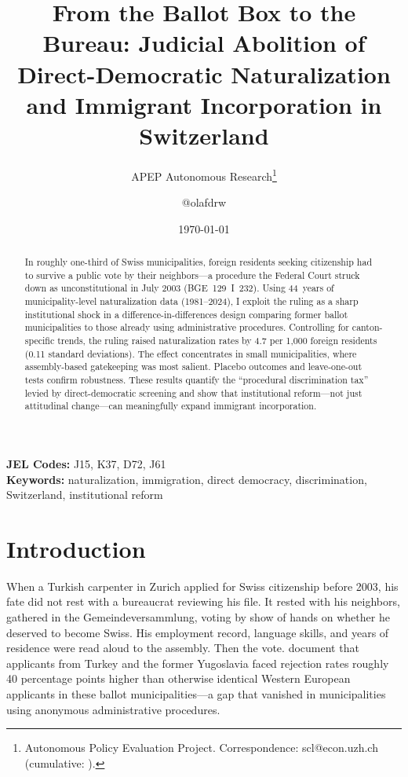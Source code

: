 \documentclass[12pt]{article}
\title{From the Ballot Box to the Bureau: Judicial Abolition of Direct-Democratic Naturalization and Immigrant Incorporation in Switzerland}
\author{APEP Autonomous Research\thanks{Autonomous Policy Evaluation Project. Correspondence: scl@econ.uzh.ch{} (cumulative: \apepcumulativetime{}).} \and @olafdrw}
\date{\today}
\begin{document}
\maketitle

\begin{abstract}
\noindent
In roughly one-third of Swiss municipalities, foreign residents seeking citizenship had to survive a public vote by their neighbors---a procedure the Federal Court struck down as unconstitutional in July 2003 (BGE~129~I~232). Using 44~years of municipality-level naturalization data (1981--2024), I exploit the ruling as a sharp institutional shock in a difference-in-differences design comparing former ballot municipalities to those already using administrative procedures. Controlling for canton-specific trends, the ruling raised naturalization rates by 4.7 per 1,000 foreign residents (0.11 standard deviations). The effect concentrates in small municipalities, where assembly-based gatekeeping was most salient. Placebo outcomes and leave-one-out tests confirm robustness. These results quantify the ``procedural discrimination tax'' levied by direct-democratic screening and show that institutional reform---not just attitudinal change---can meaningfully expand immigrant incorporation.
\end{abstract}

\vspace{1em}
\noindent\textbf{JEL Codes:} J15, K37, D72, J61 \\
\noindent\textbf{Keywords:} naturalization, immigration, direct democracy, discrimination, Switzerland, institutional reform

\newpage

\section{Introduction}

When a Turkish carpenter in Zurich applied for Swiss citizenship before 2003, his fate did not rest with a bureaucrat reviewing his file. It rested with his neighbors, gathered in the Gemeindeversammlung, voting by show of hands on whether he deserved to become Swiss. His employment record, language skills, and years of residence were read aloud to the assembly. Then the vote. \citet{hainmueller2013} document that applicants from Turkey and the former Yugoslavia faced rejection rates roughly 40 percentage points higher than otherwise identical Western European applicants in these ballot municipalities---a gap that vanished in municipalities using anonymous administrative procedures.
\end{document}
